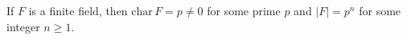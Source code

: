 If $F$ is a finite field, then $\mathrm{char}\,F = p \neq 0$ for some prime $p$ and $|F| = p^n$ for some integer $n \geq 1$.
